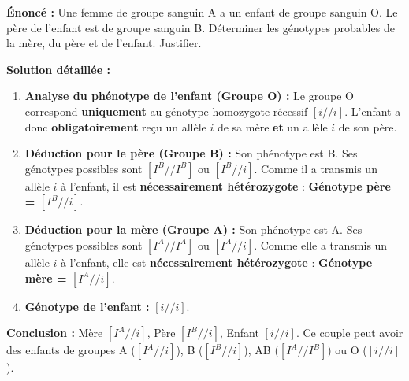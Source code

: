 \documentclass[11pt]{article}
\begin{document}
\begin{exoresolu}
\textbf{Énoncé :} Une femme de groupe sanguin A a un enfant de groupe sanguin O. Le père de l'enfant est de groupe sanguin B. Déterminer les génotypes probables de la mère, du père et de l'enfant. Justifier.

\textbf{Solution détaillée :}
\begin{enumerate}
    \item \textbf{Analyse du phénotype de l'enfant (Groupe O) :} Le groupe O correspond \textbf{uniquement} au génotype homozygote récessif $[i//i]$. L'enfant a donc \textbf{obligatoirement} reçu un allèle $i$ de sa mère \textbf{et} un allèle $i$ de son père.
    \item \textbf{Déduction pour le père (Groupe B) :} Son phénotype est B. Ses génotypes possibles sont $[I^B//I^B]$ ou $[I^B//i]$. Comme il a transmis un allèle $i$ à l'enfant, il est \textbf{nécessairement hétérozygote} : \textbf{Génotype père = $[I^B//i]$}.
    \item \textbf{Déduction pour la mère (Groupe A) :} Son phénotype est A. Ses génotypes possibles sont $[I^A//I^A]$ ou $[I^A//i]$. Comme elle a transmis un allèle $i$ à l'enfant, elle est \textbf{nécessairement hétérozygote} : \textbf{Génotype mère = $[I^A//i]$}.
    \item \textbf{Génotype de l'enfant :} \textbf{$[i//i]$}.
\end{enumerate}
\textbf{Conclusion :} Mère $[I^A//i]$, Père $[I^B//i]$, Enfant $[i//i]$. Ce couple peut avoir des enfants de groupes A ($[I^A//i]$), B ($[I^B//i]$), AB ($[I^A//I^B]$) ou O ($[i//i]$).
\end{exoresolu}
\end{document}
